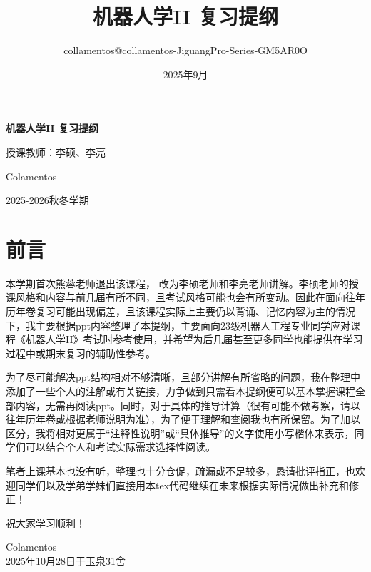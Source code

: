 \documentclass[a4paper,11pt]{article}
\title{机器人学II 复习提纲 \\ \vspace{0.5cm} \large }
\author{collamentos@collamentos-JiguangPro-Series-GM5AR0O}
\date{2025年9月}
\begin{document}
\begin{titlepage}
    \centering
    \vspace*{3cm}
    {\Huge \textbf{机器人学II 复习提纲} \par}
    \vspace{0.5cm}
    {\Large 授课教师：李硕、李亮\par}
    \vspace{3cm}
    {\Large Colamentos \par}
    {\Large 2025-2026秋冬学期 \par}
\end{titlepage}

\section*{前言}

本学期首次熊蓉老师退出该课程， 改为李硕老师和李亮老师讲解。李硕老师的授课风格和内容与前几届有所不同，且考试风格可能也会有所变动。因此在面向往年历年卷复习可能出现偏差，且该课程实际上主要仍以背诵、记忆内容为主的情况下，我主要根据ppt内容整理了本提纲，主要面向23级机器人工程专业同学应对课程《机器人学II》考试时参考使用，并希望为后几届甚至更多同学也能提供在学习过程中或期末复习的辅助性参考。

为了尽可能解决ppt结构相对不够清晰，且部分讲解有所省略的问题，我在整理中添加了一些个人的注解或有关链接，力争做到只需看本提纲便可以基本掌握课程全部内容，无需再阅读ppt。同时，对于具体的推导计算（很有可能不做考察，请以往年历年卷或根据老师说明为准），为了便于理解和查阅我也有所保留。为了加以区分，我将相对更属于“注释性说明”或“具体推导”的文字使用小写楷体来表示，同学们可以结合个人和考试实际需求选择性阅读。

笔者上课基本也没有听，整理也十分仓促，疏漏或不足较多，恳请批评指正，也欢迎同学们以及学弟学妹们直接用本tex代码继续在未来根据实际情况做出补充和修正！

祝大家学习顺利！

\begin{flushright}
Colamentos\\
2025年10月28日于玉泉31舍
\end{flushright}
\newpage
\tableofcontents
\thispagestyle{empty}
\newpage










\end{document}
